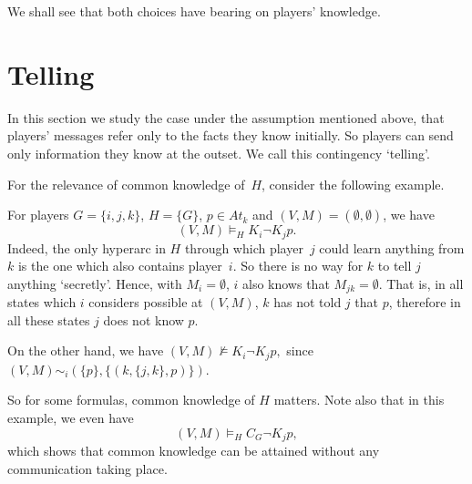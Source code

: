 \documentclass{article}
\newcounter{#1}
\newcommand{\state}[1][]{\ensuremath{(V#1,M#1)}\xspace}
\newcommand{\msg}[3]{\ensuremath{(#1,#2,#3)}\xspace}
\newcommand{\bits}{\ensuremath{At}\xspace}
\newcommand{\knows}[1]{\ensuremath{K_{#1}}\xspace}
\newcommand{\ck}[1]{\ensuremath{C_{#1}}\xspace}\newcommand{\Facts}{\mathit{Facts}}
\renewcommand{\enspace}{}
\begin{document}
We shall see that both choices have bearing on players' knowledge.


\section{Telling}
\label{sec:telling}

In this section we study the case under the assumption mentioned above,
that players' messages refer only to the facts they know initially.
So players can send only information they know at the outset.
We call this contingency `telling'.

For the relevance of common knowledge of~$H$, consider the following example.
\begin{example}
  \label{ex:ck-of-h-matters-for-negative}
  For players $G=\{i,j,k\}$, $H=\{G\}$, $p\in \bits_k$ and $\state=(\emptyset,\emptyset)$,
  we have
  \[
  \state\vDash_H\knows i\neg \knows j p\enspace.
  \]
  Indeed, the only hyperarc in $H$ through which player~$j$ could learn anything from $k$
  is the one which also contains player~$i$.
  So there is no way for $k$ to tell $j$ anything `secretly'.
  Hence, with $M_i=\emptyset$,
  $i$ also knows that $M_{jk}=\emptyset$.
  That is, in all states which $i$ considers possible at \state,
  $k$ has not told $j$ that $p$,
  therefore in all these states $j$ does not know $p$.

  On the other hand, we have
$ \state\nvDash \knows i\neg \knows j p\enspace,
$ since $\state\sim_i(\{p\},\{\msg{k}{\{j,k\}}{p}\})$.

  So for some formulas, common knowledge of $H$ matters.
  Note also that in this example, we even have
  \[
  \state\vDash_H\ck G\neg \knows j p\enspace,
  \]
  which shows that common knowledge can be attained without any communication taking place.
\end{example}
\end{document}

